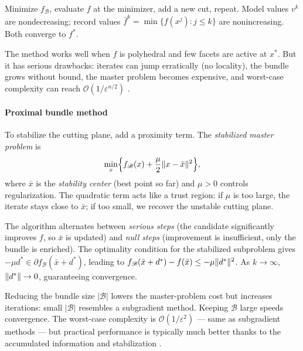 Minimize $f_{\mathcal{B}}$, evaluate $f$ at the minimizer, add a new cut, repeat.
Model values $v^k$ are nondecreasing; record values $\bar{f}^k = \min\{f(x^j) : j \leq k\}$ are nonincreasing.
Both converge to $f^*$.

The method works well when $f$ is polyhedral and few facets are active at $x^*$.
But it has serious drawbacks: iterates can jump erratically (no locality), the bundle grows without bound, the master problem becomes expensive, and worst-case complexity can reach $\mathcal{O}(1/\varepsilon^{n/2})$ \cite{frangioni2020}.

\paragraph{Proximal bundle method}

To stabilize the cutting plane, add a proximity term.
The \textit{stabilized master problem} is
\begin{equation}\label{eq:proximal-bundle}
	\min_x \Bigl\{f_{\mathcal{B}}(x) + \frac{\mu}{2}\lVert x - \bar{x}\rVert^2\Bigr\},
\end{equation}
where $\bar{x}$ is the \textit{stability center} (best point so far) and $\mu > 0$ controls regularization.
The quadratic term acts like a trust region: if $\mu$ is too large, the iterate stays close to $\bar{x}$; if too small, we recover the unstable cutting plane.

The algorithm alternates between \textit{serious steps} (the candidate significantly improves $f$, so $\bar{x}$ is updated) and \textit{null steps} (improvement is insufficient, only the bundle is enriched).
The optimality condition for the stabilized subproblem gives $-\mu d^* \in \partial f_{\mathcal{B}}(\bar{x} + d^*)$, leading to $f_{\mathcal{B}}(\bar{x} + d^*) - f(\bar{x}) \leq -\mu\lVert d^*\rVert^2$.
As $k \to \infty$, $\lVert d^*\rVert \to 0$, guaranteeing convergence.

Reducing the bundle size $|\mathcal{B}|$ lowers the master-problem cost but increases iterations: small $|\mathcal{B}|$ resembles a subgradient method.
Keeping $\mathcal{B}$ large speeds convergence.
The worst-case complexity is $\mathcal{O}(1/\varepsilon^2)$ --- same as subgradient methods --- but practical performance is typically much better thanks to the accumulated information and stabilization \cite{frangioni2020}.